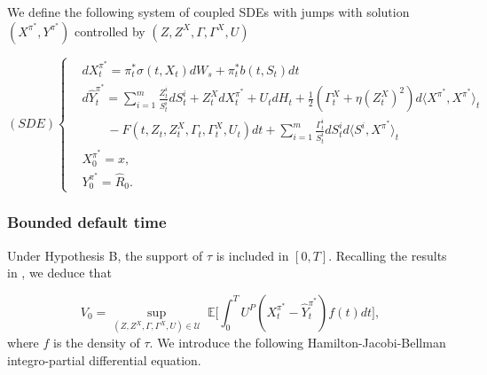 \documentclass[11pt,a4paper]{article}
\theoremstyle{thmstyleone}%
\theoremstyle{thmstyletwo}%
\theoremstyle{thmstylethree}%
\newcommand{\E}{\mathbb{E}}
\begin{document}
We define the following system of coupled SDEs with jumps with solution $(X^{\pi^*},Y^{\pi^*})$ controlled by $(Z,Z^X,\Gamma,\Gamma^X,U)$

\[
(SDE)\begin{cases}
     &dX^{\pi^*}_t =  \pi_t^*\sigma(t,X_t) dW_s + \pi_t^* b(t,S_t) dt\\
     &d\hat Y^{\pi^*}_t= \sum_{i=1}^m \frac{Z^i_t}{S^i_t} dS^i_t +  Z_t^X dX^{\pi^*}_t +  U_t dH_t+ \frac{1}{2} (\Gamma_t^X + \eta (Z_t^X)^2 ) d\langle X^{\pi^*}, X^{\pi^*}\rangle_t\\
     &\qquad - F(t, Z_t, Z_t^X, \Gamma_t, \Gamma_t^X,U_t) dt+\sum_{i=1}^m \frac{\Gamma^i_t}{S^i_t} dS^i_t d\langle S^i, X^{\pi^*}\rangle_t\\
     &X^{\pi^*}_0=x,\\
     &Y^{\pi^*}_0=\hat R_0. 
\end{cases}
\]




\subsubsection{Bounded default time}
Under Hypothesis B, the support of $\tau$ is included in $[0,T]$. Recalling the results in \cite{blanchet2008optimal}, we deduce that

\begin{equation*}
V_0= \sup_{(Z, Z^X, \Gamma, \Gamma^X, U)\in \mathcal U}\;  \E\bigl[ \int_{0}^T U^P(X_t^{\pi^*} -\hat{Y}^{\pi^*}_t) f(t)dt \bigl],
\end{equation*}
where $f$ is the density of $\tau$. We introduce the following Hamilton-Jacobi-Bellman integro-partial differential equation.
\end{document}
